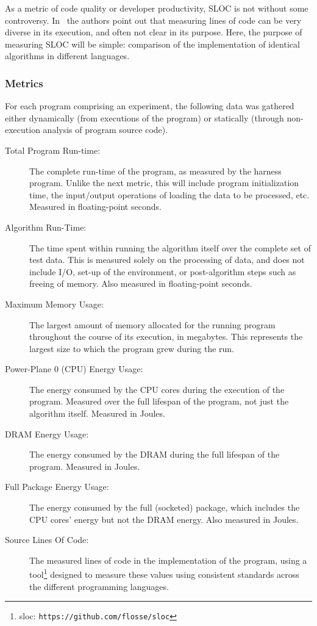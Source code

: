 As a metric of code quality or developer productivity, SLOC is not without some controversy. In~\cite{alpernas.2020} the authors point out that measuring lines of code can be very diverse in its execution, and often not clear in its purpose. Here, the purpose of measuring SLOC will be simple: comparison of the implementation of identical algorithms in different languages.

\subsubsection{Metrics}

For each program comprising an experiment, the following data was gathered either dynamically (from executions of the program) or statically (through non-execution analysis of program source code).

\begin{description}
\item[Total Program Run-time:] The complete run-time of the program, as measured by the harness program. Unlike the next metric, this will include program initialization time, the input/output operations of loading the data to be processed, etc. Measured in floating-point seconds.
\item[Algorithm Run-Time:] The time spent within running the algorithm itself over the complete set of test data. This is measured solely on the processing of data, and does not include I/O, set-up of the environment, or post-algorithm steps such as freeing of memory. Also measured in floating-point seconds.
\item[Maximum Memory Usage:] The largest amount of memory allocated for the running program throughout the course of its execution, in megabytes. This represents the largest size to which the program grew during the run.
\item[Power-Plane 0 (CPU) Energy Usage:] The energy consumed by the CPU cores during the execution of the program. Measured over the full lifespan of the program, not just the algorithm itself. Measured in Joules.
\item[DRAM Energy Usage:] The energy consumed by the DRAM during the full lifespan of the program. Measured in Joules.
\item[Full Package Energy Usage:] The energy consumed by the full (socketed) package, which includes the CPU cores' energy but not the DRAM energy. Also measured in Joules.
\item[Source Lines Of Code:] The measured lines of code in the implementation of the program, using a tool\footnote{sloc: \texttt{https://github.com/flosse/sloc}} designed to measure these values using consistent standards across the different programming languages.
\end{description}

